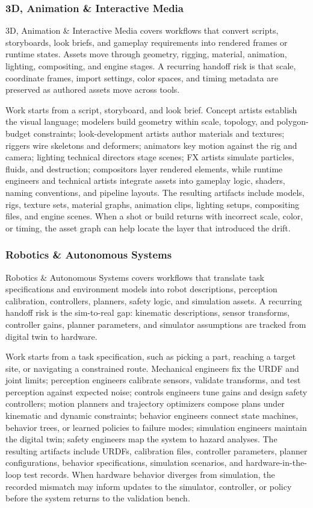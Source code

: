 \documentclass{llmxive}
\begin{document}
\subsubsection{3D, Animation \& Interactive Media}
3D, Animation \& Interactive Media covers workflows that convert scripts, storyboards, look briefs,
and gameplay requirements into rendered frames or runtime states. Assets move through geometry,
rigging, material, animation, lighting, compositing, and engine stages. A recurring handoff risk is
that scale, coordinate frames, import settings, color spaces, and timing metadata are preserved as
authored assets move across tools.

Work starts from a script, storyboard, and look brief. Concept artists establish the visual language;
modelers build geometry within scale, topology, and polygon-budget constraints; look-development
artists author materials and textures; riggers wire skeletons and deformers; animators key motion
against the rig and camera; lighting technical directors stage scenes; FX artists simulate particles,
fluids, and destruction; compositors layer rendered elements, while runtime engineers and technical
artists integrate assets into gameplay logic, shaders, naming conventions, and pipeline layouts. The
resulting artifacts include models, rigs, texture sets, material graphs, animation clips, lighting
setups, compositing files, and engine scenes. When a shot or build returns with incorrect scale,
color, or timing, the asset graph can help locate the layer that introduced the drift.

\subsubsection{Robotics \& Autonomous Systems}
Robotics \& Autonomous Systems covers workflows that translate task specifications and environment
models into robot descriptions, perception calibration, controllers, planners, safety logic, and
simulation assets. A recurring handoff risk is the sim-to-real gap: kinematic descriptions, sensor
transforms, controller gains, planner parameters, and simulator assumptions are tracked from digital
twin to hardware.

Work starts from a task specification, such as picking a part, reaching a target site, or navigating
a constrained route. Mechanical engineers fix the URDF and joint limits; perception engineers
calibrate sensors, validate transforms, and test perception against expected noise; controls
engineers tune gains and design safety controllers; motion planners and trajectory optimizers compose
plans under kinematic and dynamic constraints; behavior engineers connect state machines, behavior
trees, or learned policies to failure modes; simulation engineers maintain the digital twin; safety
engineers map the system to hazard analyses. The resulting artifacts include URDFs, calibration
files, controller parameters, planner configurations, behavior specifications, simulation scenarios,
and hardware-in-the-loop test records. When hardware behavior diverges from simulation, the recorded
mismatch may inform updates to the simulator, controller, or policy before the system returns to the
validation bench.
\end{document}
